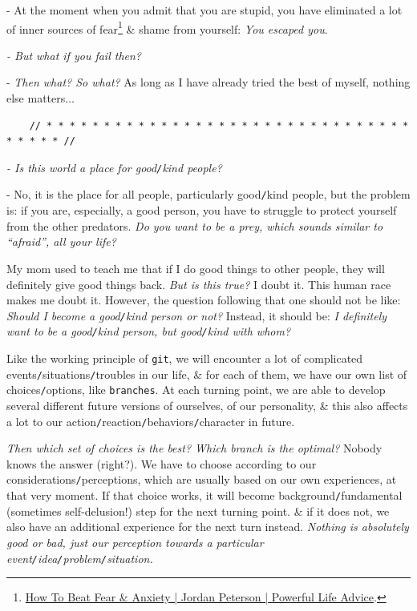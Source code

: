 \documentclass[12pt]{article}
\begin{document}
- At the moment when you admit that you are stupid, you have eliminated a lot of inner sources of fear\footnote{\href{https://www.youtube.com/watch?v=bb9g9mtDHZo}{How To Beat Fear \& Anxiety | Jordan Peterson | Powerful Life Advice}.} \& shame from yourself: {\it You escaped you}.

{\it - But what if you fail then?}

- {\it Then what? So what?} As long as I have already tried the best of myself, nothing else matters$\ldots$

\begin{verbatim}
	// * * * * * * * * * * * * * * * * * * * * * * * * * * * * * * * * * * * * * //
\end{verbatim}

\noindent
{} {\it - Is this world a place for good{\tt/}kind people?}

- No, it is the place for all people, particularly good{\tt/}kind people, but the problem is: if you are, especially, a good person, you have to struggle to protect yourself from the other predators. {\it Do you want to be a prey, which sounds similar to ``afraid'', all your life?} 

My mom used to teach me that if I do good things to other people, they will definitely give good things back. {\it But is this true?} I doubt it. This human race makes me doubt it. However, the question following that one should not be like: {\it Should I become a good{\tt/}kind person or not?} Instead, it should be: {\it I definitely want to be a good{\tt/}kind person, but good{\tt/}kind with whom?}

Like the working principle of {\tt git}, we will encounter a lot of complicated events{\tt/}situations{\tt/}troubles in our life, \& for each of them, we have our own list of choices{\tt/}options, like {\tt branches}. At each turning point, we are able to develop several different future versions of ourselves, of our personality, \& this also affects a lot to our action{\tt/}reaction{\tt/}behaviors{\tt/}character in future.

{\it Then which set of choices is the best? Which branch is the optimal?} Nobody knows the answer (right?). We have to choose according to our considerations{\tt/}perceptions, which are usually based on our own experiences, at that very moment. If that choice works, it will become background{\tt/}fundamental (sometimes self-delusion!) step for the next turning point. \& if it does not, we also have an additional experience for the next turn instead. {\it Nothing is absolutely good or bad, just our perception towards a particular event{\tt/}idea{\tt/}problem{\tt/}situation.}
\end{document}
